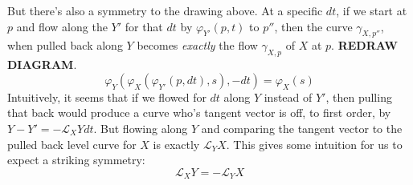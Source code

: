 	But there's also a symmetry to the drawing above. At a specific $dt$, if we start at $p$ and flow along the $Y'$ for that $dt$ by $\varphi_{Y'}(p, t)$ to $p''$, then the curve $\gamma_{X, p''}$, when pulled back along $Y$ becomes \emph{exactly} the flow $\gamma_{X,p}$ of $X$ at $p$.
	\textbf{REDRAW DIAGRAM}.
	\begin{equation}
		\varphi_Y (\varphi_X (\varphi_{Y'} (p, dt), s), -dt) =  \varphi_X(s)
	\end{equation}
	Intuitively, it seems that if we flowed for $dt$ along $Y$ instead of $Y'$, then pulling that back would produce a curve who's tangent vector is off, to first order, by $Y-Y' = - \mathcal L_X Y dt$. But flowing along $Y$ and comparing the tangent vector to the pulled back level curve for $X$ is exactly $\mathcal L_Y X$. This gives some intuition for us to expect a striking symmetry:
	\begin{equation}
		\mathcal L_X Y = - \mathcal L_Y X
	\end{equation}

